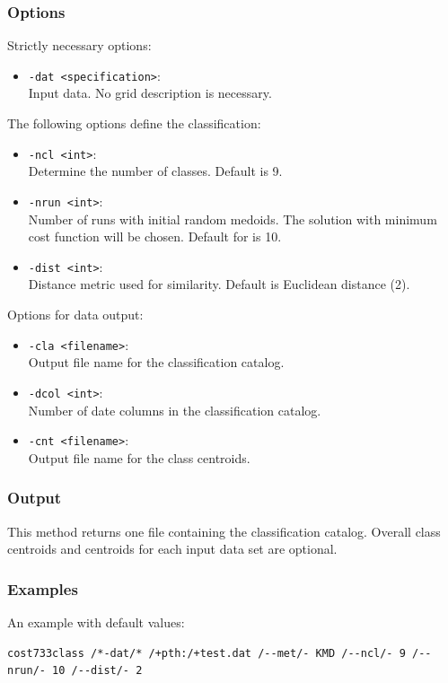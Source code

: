 \documentclass[12pt, oneside, a4paper, headsepline, plainheadsepline]{scrbook}
\begin{document}
\subsubsection*{Options}
Strictly necessary options:
\begin{itemize}
 \item \verb+-dat <specification>+:\\ Input data. No grid description is necessary.
\end{itemize}
The following options define the classification:
\begin{itemize}
 \item \verb+-ncl <int>+:\\ 
 Determine the number of classes. Default is 9.  
 \item \verb+-nrun <int>+:\\ 	
 Number of runs with initial random medoids. The solution with minimum cost function will be chosen. Default for is 10.
 \item \verb+-dist <int>+: \\
 Distance metric used for similarity. Default is Euclidean distance (2).
\end{itemize}
Options for data output:
\begin{itemize}
 \item \verb+-cla <filename>+:\\ Output file name for the classification catalog.
 \item \verb+-dcol <int>+:\\ Number of date columns in the classification catalog.
 \item \verb+-cnt <filename>+:\\ Output file name for the class centroids.
\end{itemize}

\subsubsection*{Output}
This method returns one file containing the classification catalog. 
Overall class centroids and centroids for each input data set are optional.

\subsubsection*{Examples}
An example with default values:
\begin{lstlisting}
cost733class /*-dat/* /+pth:/+test.dat /--met/- KMD /--ncl/- 9 /--nrun/- 10 /--dist/- 2 
\end{lstlisting}
\end{document}
